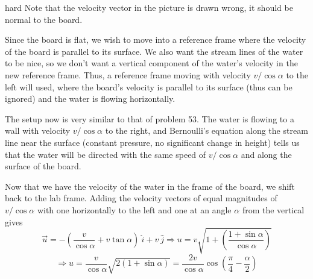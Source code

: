 \begin{solution}{hard}
Note that the velocity vector in the picture is drawn wrong, it should be normal to the board.
\vspace{2mm}

Since the board is flat, we wish to move into a reference frame where the velocity of the board is parallel to its surface. We also want the stream lines of the water to be nice, so we don’t want a vertical component of the water’s velocity in the new reference frame. Thus, a reference frame moving with velocity $v/\cos\alpha$ to the left will used, where the board’s velocity is parallel to its surface (thus can be ignored) and the water is flowing horizontally.
\vspace{2mm}

The setup now is very similar to that of problem 53. The water is flowing to a wall with velocity $v/\cos\alpha$ to the right, and Bernoulli’s equation along the stream line near the surface (constant pressure, no significant change in height) tells us that the water will be directed with the same speed of $v/\cos\alpha$ and along the surface of the board.
\vspace{2mm}

Now that we have the velocity of the water in the frame of the board, we shift back to the lab frame. Adding the velocity vectors of equal magnitudes of $v/\cos\alpha$ with one horizontally to the left and one at an angle $\alpha$ from the vertical gives
$$ \vec{u} = -\left(\frac{v}{\cos{\alpha}} + v \tan{\alpha}\right)\  \hat{i} + v\ \hat{j} \Rightarrow u = v \sqrt{1+\left(\frac{1+\sin{\alpha}}{\cos{\alpha}}\right)}$$ $$ \Rightarrow u = \frac{v}{\cos{\alpha}}\sqrt{2(1+\sin{\alpha})}   = \boxed{\frac{2v}{\cos{\alpha}} \cos\left(\frac\pi 4-\frac\alpha2\right)}$$
\end{solution}
